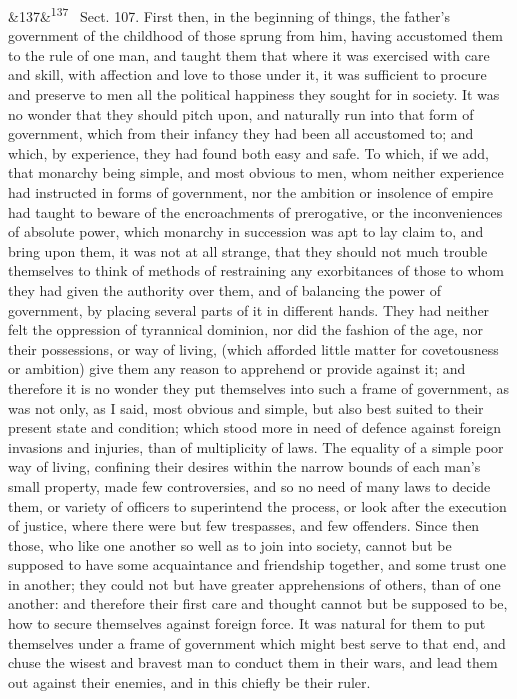 \documentclass[12pt]{article}
\newcommand{\para}[1][]{\par\noindent\ifx&#1&\else\textsuperscript{\footnotesize #1}~\fi}
\begin{document}
\para[137] Sect. 107. First then, in the beginning of things, the father's government of the childhood of those sprung from him, having accustomed them to the rule of one man, and taught them that where it was exercised with care and skill, with affection and love to those under it, it was sufficient to procure and preserve to men all the political happiness they sought for in society. It was no wonder that they should pitch upon, and naturally run into that form of government, which from their infancy they had been all accustomed to; and which, by experience, they had found both easy and safe. To which, if we add, that monarchy being simple, and most obvious to men, whom neither experience had instructed in forms of government, nor the ambition or insolence of empire had taught to beware of the encroachments of prerogative, or the inconveniences of absolute power, which monarchy in succession was apt to lay claim to, and bring upon them, it was not at all strange, that they should not much trouble themselves to think of methods of restraining any exorbitances of those to whom they had given the authority over them, and of balancing the power of government, by placing several parts of it in different hands. They had neither felt the oppression of tyrannical dominion, nor did the fashion of the age, nor their possessions, or way of living, (which afforded little matter for covetousness or ambition) give them any reason to apprehend or provide against it; and therefore it is no wonder they put themselves into such a frame of government, as was not only, as I said, most obvious and simple, but also best suited to their present state and condition; which stood more in need of defence against foreign invasions and injuries, than of multiplicity of laws. The equality of a simple poor way of living, confining their desires within the narrow bounds of each man's small property, made few controversies, and so no need of many laws to decide them, or variety of officers to superintend the process, or look after the execution of justice, where there were but few trespasses, and few offenders. Since then those, who like one another so well as to join into society, cannot but be supposed to have some acquaintance and friendship together, and some trust one in another; they could not but have greater apprehensions of others, than of one another: and therefore their first care and thought cannot but be supposed to be, how to secure themselves against foreign force. It was natural for them to put themselves under a frame of government which might best serve to that end, and chuse the wisest and bravest man to conduct them in their wars, and lead them out against their enemies, and in this chiefly be their ruler.
\end{document}
